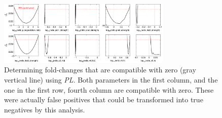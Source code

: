 \documentclass{bioinfo}
\begin{document}
\begin{figure}[!tpb]%
\centerline{\includegraphics[width=235pt]{Figures/multi_plot.pdf}}
\caption{Determining fold-changes that are compatible with zero (gray vertical line) using \emph{PL}. Both parameters in the first column, and the one in the first row, fourth column are compatible with zero. These were actually false positives that could be transformed into true negatives by this analysis.}\label{fig:06}
\end{figure}
\end{document}

